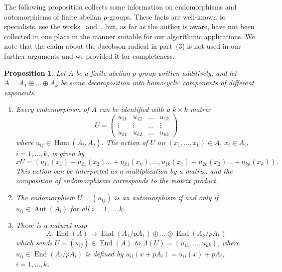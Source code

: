 \documentclass{article}
\newtheorem{proposition}[theorem]{Proposition}
\DeclareMathOperator{\Aut}{Aut}
\DeclareMathOperator{\Hom}{Hom}
\DeclareMathOperator{\End}{End}
\begin{document}
The following proposition collects some information on endomorphisms and automorphisms
of finite abelian \( p \)-groups. These facts are well-known to specialists, see the works~\cite{ranum, hillar, mader} and~\cite[Lemma~6.1]{absyl},
but, as far as the author is aware, have not been collected in one place in the manner suitable for our algorithmic applications.
We note that the claim about the Jacobson radical in part~(3) is not used in our further arguments and we provided it for completeness.

\begin{proposition}\label{autab}
	Let \( A \) be a finite abelian \( p \)-group written additively, and let \( A = A_1 \oplus \dots \oplus A_k \)
	be some decomposition into homocyclic components of different exponents.
	\begin{enumerate}
		\item Every endomorphism of \( A \) can be identified with a \( k \times k \) matrix
			\[ U =
			\begin{pmatrix}
				u_{11} & u_{12} & \dots & u_{1k}\\
				\vdots & \vdots & \dots & \vdots\\
				u_{k1} & u_{k2} & \dots & u_{kk}
			\end{pmatrix}
			\]
			where \( u_{ij} \in \Hom(A_i, A_j) \).
			The action of \( U \) on \( (x_1, \dots, x_k) \in A \), \( x_i \in A_i \), \( i = 1, \dots, k \),
			is given by
			\[ 
			xU = (u_{11}(x_1) + u_{21}(x_2) \dots + u_{k1}(x_k), \dots, u_{1k}(x_1) + u_{2k}(x_2) \dots + u_{kk}(x_k)).
			\]
			This action can be interpreted as a multiplication by a matrix, and the composition of endomorphisms
			corresponds to the matrix product.
		\item The endomorphism \( U = (u_{ij}) \) is an automorphism if and only if \( u_{ii} \in \Aut(A_i) \) for all \( i = 1, \dots, k \).
		\item There is a natural map
			\[ \Lambda : \End(A) \to \End(A_1 / pA_1) \oplus \dots \oplus \End(A_k / pA_k) \]
			which sends \( U = (u_{ij}) \in \End(A) \) to \( \Lambda(U) = (\overline{u_{11}}, \dots, \overline{u_{kk}}) \),
			where \( \overline{u_{ii}} \in \End(A_i / pA_i) \) is defined by \( \overline{u_{ii}}(x + pA_i) = u_{ii}(x) + pA_i \),
			\( i = 1, \dots, k \).


\end{enumerate}
\end{proposition}
\end{document}
